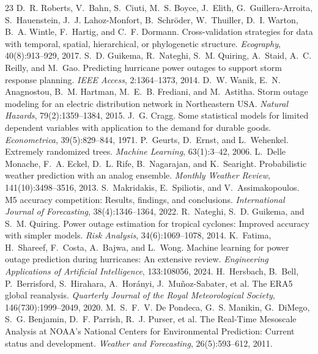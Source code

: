 \documentclass[10pt]{article}
\begin{document}
\begin{thebibliography}{23}
 D.~R. Roberts, V.~Bahn, S.~Ciuti, M.~S. Boyce, J.~Elith, G.~Guillera-Arroita, S.~Hauenstein, J.~J. Lahoz-Monfort, B.~Schr\"oder, W.~Thuiller, D.~I. Warton, B.~A. Wintle, F.~Hartig, and C.~F. Dormann. Cross-validation strategies for data with temporal, spatial, hierarchical, or phylogenetic structure. \emph{Ecography}, 40(8):913--929, 2017.
 S.~D. Guikema, R.~Nateghi, S.~M. Quiring, A.~Staid, A.~C. Reilly, and M.~Gao. Predicting hurricane power outages to support storm response planning. \emph{IEEE Access}, 2:1364--1373, 2014.
 D.~W. Wanik, E.~N. Anagnostou, B.~M. Hartman, M.~E.~B. Frediani, and M.~Astitha. Storm outage modeling for an electric distribution network in Northeastern USA. \emph{Natural Hazards}, 79(2):1359--1384, 2015.
 J.~G. Cragg. Some statistical models for limited dependent variables with application to the demand for durable goods. \emph{Econometrica}, 39(5):829--844, 1971.
 P.~Geurts, D.~Ernst, and L.~Wehenkel. Extremely randomized trees. \emph{Machine Learning}, 63(1):3--42, 2006.
 L.~Delle Monache, F.~A. Eckel, D.~L. Rife, B.~Nagarajan, and K.~Searight. Probabilistic weather prediction with an analog ensemble. \emph{Monthly Weather Review}, 141(10):3498--3516, 2013.
 S.~Makridakis, E.~Spiliotis, and V.~Assimakopoulos. M5 accuracy competition: Results, findings, and conclusions. \emph{International Journal of Forecasting}, 38(4):1346--1364, 2022.
 R.~Nateghi, S.~D. Guikema, and S.~M. Quiring. Power outage estimation for tropical cyclones: Improved accuracy with simpler models. \emph{Risk Analysis}, 34(6):1069--1078, 2014.
 K.~Fatima, H.~Shareef, F.~Costa, A.~Bajwa, and L.~Wong. Machine learning for power outage prediction during hurricanes: An extensive review. \emph{Engineering Applications of Artificial Intelligence}, 133:108056, 2024.
 H.~Hersbach, B.~Bell, P.~Berrisford, S.~Hirahara, A.~Hor\'anyi, J.~Mu\~noz-Sabater, et al. The ERA5 global reanalysis. \emph{Quarterly Journal of the Royal Meteorological Society}, 146(730):1999--2049, 2020.
 M.~S.~F.~V. De Pondeca, G.~S. Manikin, G.~DiMego, S.~G. Benjamin, D.~F. Parrish, R.~J. Purser, et al. The Real-Time Mesoscale Analysis at NOAA's National Centers for Environmental Prediction: Current status and development. \emph{Weather and Forecasting}, 26(5):593--612, 2011.

\end{thebibliography}
\end{document}
